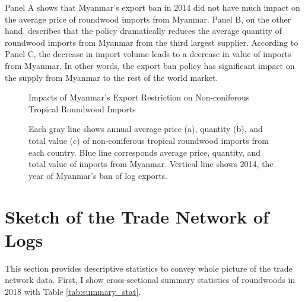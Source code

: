 \documentclass[a4paper,12pt]{article}
\begin{document}
Panel A shows that Myanmar's export ban in 2014 did not have much impact on the average price of roundwood imports from Myanmar. Panel B, on the other hand, describes that the policy dramatically reduces the average quantity of roundwood imports from Myanmar from the third largest supplier. According to Panel C, the decrease in import volume leads to a decrease in value of imports from Myanmar. In other words, the export ban policy has significant impact on the supply from Myanmar to the rest of the world market. 

\begin{figure}[H] 
    \centering
    \caption{Impacts of Myanmar's Export Restriction on Non-coniferous Tropical Roundwood Imports}
    \caption*{\small{Each gray line shows annual average price (a), quantity (b), and total value (c) of non-coniferous tropical roundwood imports from each country. Blue line corresponds average price, quantity, and total value of imports from Myanmar. Vertical line shows 2014, the year of Myanmar's ban of log exports.}}
    \label{fig:shock_Myanmar}
\end{figure}

\section{Sketch of the Trade Network of Logs}
This section provides descriptive statistics to convey whole picture of the trade network data. First, I show cross-sectional summary statistics of roundwoods in 2018 with Table \ref{tab:summary_stat}.
\end{document}

